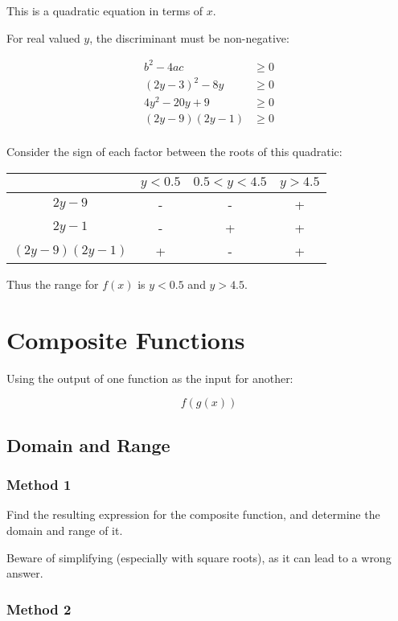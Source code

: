 \documentclass[a4paper,11pt]{article}
\begin{document}
This is a quadratic equation in terms of $x$.

For real valued $y$, the discriminant must be non-negative:

$$
\begin{aligned}
b^2 - 4ac & \geq 0 \\
(2y - 3)^2 - 8y & \geq 0 \\
4y^2 - 20y + 9 & \geq 0 \\
(2y - 9)(2y - 1) & \geq 0 \\
\end{aligned}
$$

Consider the sign of each factor between the roots of this quadratic:

\begin{center}
\begin{tabular}{c|c|c|c}
& $y < 0.5$ & $0.5 < y < 4.5$ & $y > 4.5$ \\
\hline
$2y - 9$ & - & - & + \\
$2y - 1$ & - & + & + \\
$(2y - 9)(2y - 1)$ & + & - & + \\
\end{tabular}
\end{center}

Thus the range for $f(x)$ is $y < 0.5$ and $y > 4.5$.




\section{Composite Functions}

Using the output of one function as the input for another:

$$
f(g(x))
$$


\subsection{Domain and Range}

\subsubsection{Method 1}

Find the resulting expression for the composite function, and determine the
domain and range of it.

Beware of simplifying (especially with square roots), as it can lead to a wrong
answer.


\subsubsection{Method 2}
\end{document}
